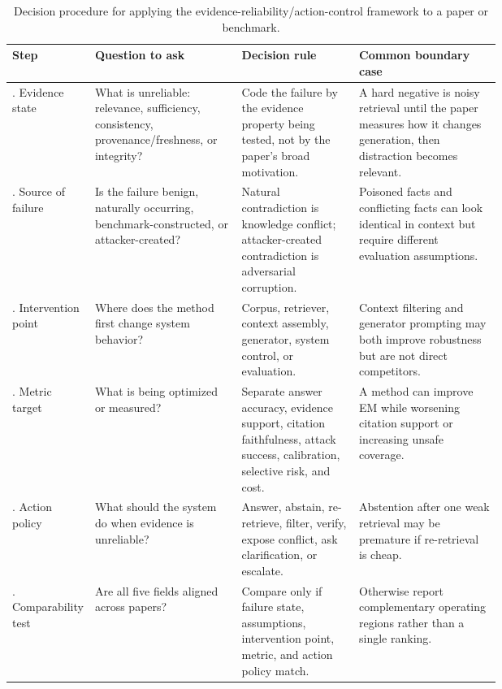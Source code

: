 \begin{table}[t]
\centering
\scriptsize
\renewcommand{\arraystretch}{0.9}
\begin{tabularx}{\linewidth}{>{\raggedright\arraybackslash}p{0.16\linewidth}>{\raggedright\arraybackslash}p{0.30\linewidth}>{\raggedright\arraybackslash}p{0.24\linewidth}X}
\toprule
\textbf{Step} & \textbf{Question to ask} & \textbf{Decision rule} & \textbf{Common boundary case} \\
\midrule
1. Evidence state & What is unreliable: relevance, sufficiency, consistency, provenance/freshness, or integrity? & Code the failure by the evidence property being tested, not by the paper's broad motivation. & A hard negative is noisy retrieval until the paper measures how it changes generation, then distraction becomes relevant. \\
2. Source of failure & Is the failure benign, naturally occurring, benchmark-constructed, or attacker-created? & Natural contradiction is knowledge conflict; attacker-created contradiction is adversarial corruption. & Poisoned facts and conflicting facts can look identical in context but require different evaluation assumptions. \\
3. Intervention point & Where does the method first change system behavior? & Corpus, retriever, context assembly, generator, system control, or evaluation. & Context filtering and generator prompting may both improve robustness but are not direct competitors. \\
4. Metric target & What is being optimized or measured? & Separate answer accuracy, evidence support, citation faithfulness, attack success, calibration, selective risk, and cost. & A method can improve EM while worsening citation support or increasing unsafe coverage. \\
5. Action policy & What should the system do when evidence is unreliable? & Answer, abstain, re-retrieve, filter, verify, expose conflict, ask clarification, or escalate. & Abstention after one weak retrieval may be premature if re-retrieval is cheap. \\
6. Comparability test & Are all five fields aligned across papers? & Compare only if failure state, assumptions, intervention point, metric, and action policy match. & Otherwise report complementary operating regions rather than a single ranking. \\
\bottomrule
\end{tabularx}
\caption{Decision procedure for applying the evidence-reliability/action-control framework to a paper or benchmark.}
\label{tab:framework-decision-procedure}
\end{table}

